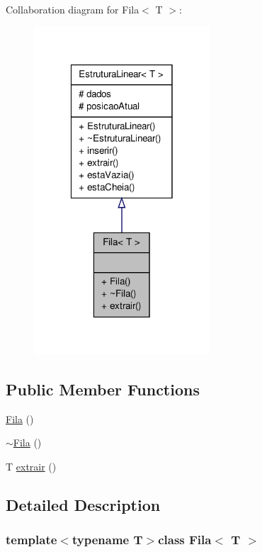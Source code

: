 \-Collaboration diagram for \-Fila$<$ \-T $>$\-:\nopagebreak
\begin{figure}[H]
\begin{center}
\leavevmode
\includegraphics[width=186pt]{classFila__coll__graph}
\end{center}
\end{figure}
\subsection*{\-Public \-Member \-Functions}
\begin{DoxyCompactItemize}
\item 
\hyperlink{classFila_af202231829ccd3849a28f61eb20e5ebc}{\-Fila} ()
\item 
\hyperlink{classFila_ad7a066d10db52b8281f2859da76e8995}{$\sim$\-Fila} ()
\item 
\-T \hyperlink{classFila_ac823a183b2713832195ed6d5a5b1a75f}{extrair} ()
\end{DoxyCompactItemize}


\subsection{\-Detailed \-Description}
\subsubsection*{template$<$typename T$>$class Fila$<$ T $>$}

